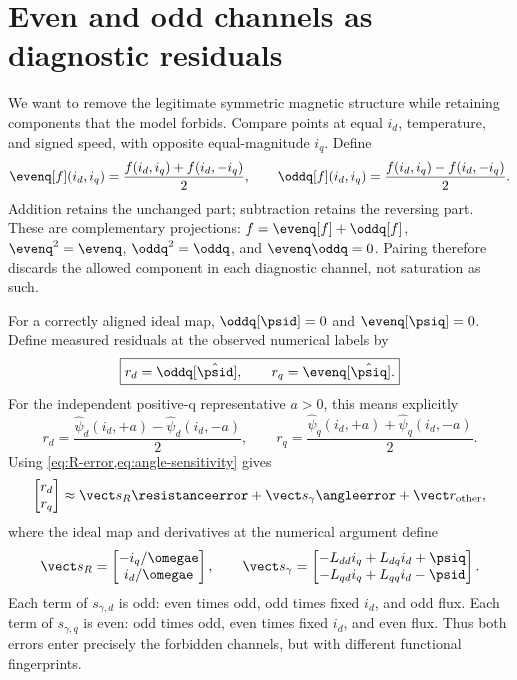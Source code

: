 \section{Even and odd channels as diagnostic residuals}
We want to remove the legitimate symmetric magnetic structure while retaining
components that the model forbids. Compare points at equal $i_d$, temperature,
and signed speed, with opposite equal-magnitude $i_q$. Define
\begin{equation}
 \evenq[f](i_d,i_q)=\frac{f(i_d,i_q)+f(i_d,-i_q)}{2},\qquad
 \oddq[f](i_d,i_q)=\frac{f(i_d,i_q)-f(i_d,-i_q)}{2}.
 \label{eq:parity-operators}
\end{equation}
Addition retains the unchanged part; subtraction retains the reversing part.
These are complementary projections: $f=\evenq[f]+\oddq[f]$,
$\evenq^2=\evenq$, $\oddq^2=\oddq$, and $\evenq\oddq=0$. Pairing therefore discards the
allowed component in each diagnostic channel, not saturation as such.


For a correctly aligned ideal map, $\oddq[\psid]=0$ and $\evenq[\psiq]=0$.
Define measured residuals at the observed numerical labels by
\begin{equation}
 \boxed{r_d=\oddq[\hat\psid],\qquad r_q=\evenq[\hat\psiq].}
 \label{eq:residuals}
\end{equation}
For the independent positive-q representative $a>0$, this means explicitly
\begin{equation}
 r_d=\frac{\hat\psi_d(i_d,+a)-\hat\psi_d(i_d,-a)}{2},\qquad
 r_q=\frac{\hat\psi_q(i_d,+a)+\hat\psi_q(i_d,-a)}{2}.
\end{equation}
Using \cref{eq:R-error,eq:angle-sensitivity} gives
\begin{equation}
 \begin{bmatrix}r_d\\r_q\end{bmatrix}\approx
 \vect s_R\resistanceerror+\vect s_\gamma\angleerror+\vect r_{\rm other},
 \label{eq:fingerprint}
\end{equation}
where the ideal map and derivatives at the numerical argument define
\begin{equation}
 \vect s_R=\begin{bmatrix}-i_q/\omegae\\i_d/\omegae\end{bmatrix},\qquad
 \vect s_\gamma=\begin{bmatrix}
 -L_{dd}i_q+L_{dq}i_d+\psiq\\
 -L_{qd}i_q+L_{qq}i_d-\psid\end{bmatrix}.
 \label{eq:columns}
\end{equation}
Each term of $s_{\gamma,d}$ is odd: even times odd, odd times fixed $i_d$,
and odd flux. Each term of $s_{\gamma,q}$ is even: odd times odd, even times
fixed $i_d$, and even flux. Thus both errors enter precisely the forbidden
channels, but with different functional fingerprints.

